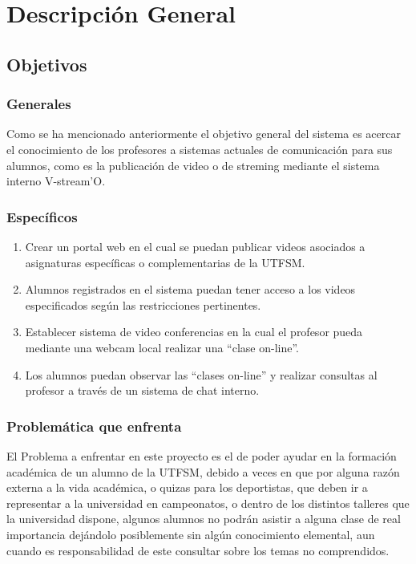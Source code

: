 \documentclass[12pt]{article}
\begin{document}
\newpage
\section{Descripción General}

\subsection{Objetivos}
\subsubsection{Generales}
Como se ha mencionado anteriormente el objetivo general del sistema es acercar el conocimiento de los 
profesores a sistemas actuales de comunicación para sus alumnos, como es la publicación de video o de streming
mediante el sistema interno V-stream'O.
\subsubsection{Específicos}
\begin{enumerate}
\item Crear un portal web en el cual se puedan publicar videos asociados a asignaturas específicas o 
complementarias de la UTFSM.
\item Alumnos registrados en el sistema puedan tener acceso a los videos especificados según las
restricciones pertinentes.
\item Establecer sistema de video conferencias en la cual el profesor pueda mediante una webcam local
realizar una ``clase on-line''.
\item Los alumnos puedan observar las ``clases on-line'' y realizar consultas al profesor a través de un 
sistema de chat interno.
\end{enumerate}

\subsubsection{Problemática que enfrenta}
El Problema a enfrentar en este proyecto es el de poder ayudar en la formación académica de un alumno de la 
UTFSM, debido a veces en que por alguna razón externa a la vida académica, o quizas para los
deportistas, que deben ir a representar a la universidad en campeonatos, o dentro de los distintos talleres 
que la universidad dispone, algunos alumnos no podrán
asistir a alguna clase de real importancia dejándolo posiblemente sin algún conocimiento elemental, aun
cuando es responsabilidad de este consultar sobre los temas no comprendidos.
\end{document}
